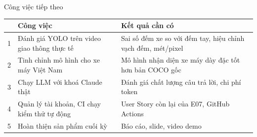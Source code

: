 \documentclass[aspectratio=169,11pt]{beamer}
\newcommand{\muc}{}
\newcommand{\datMuc}[1]{\renewcommand{\muc}{ - #1}}
\begin{document}
\datMuc{Kế hoạch}

\begin{frame}{Công việc tiếp theo}
  \footnotesize
  \renewcommand{\arraystretch}{1.8}
  \begin{tabularx}{\textwidth}{@{}l>{\raggedright\arraybackslash}p{5.4cm}>{\raggedright\arraybackslash}X@{}}
    \toprule
     & \textbf{Công việc} & \textbf{Kết quả cần có}\\
    \midrule
    1 & Đánh giá YOLO trên video giao thông thực tế & Sai số đếm xe so với đếm tay, hiệu chỉnh vạch đếm, mét/pixel\\
    2 & Tinh chỉnh mô hình cho xe máy Việt Nam      & Mô hình nhận diện xe máy dày đặc tốt hơn bản COCO gốc\\
    3 & Chạy LLM với khoá Claude thật               & Đánh giá chất lượng câu trả lời, chi phí token\\
    4 & Quản lý tài khoản, CI chạy kiểm thử tự động & User Story còn lại của E07, GitHub Actions\\
    5 & Hoàn thiện sản phẩm cuối kỳ                 & Báo cáo, slide, video demo\\
    \bottomrule
  \end{tabularx}
\end{frame}
\end{document}
